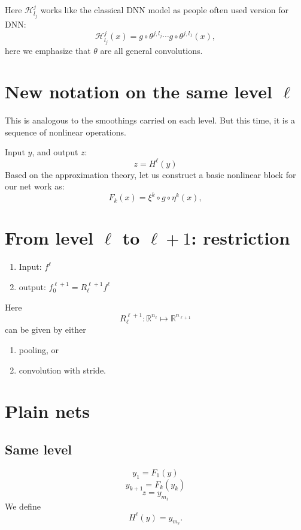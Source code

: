 Here $\mathcal{H}^j_{l_j}$ works like the classical DNN model as people often used version for DNN:
\begin{equation}
	\mathcal{H}_{l_j}^j (x) = g \circ \theta^{j,{l_j}}  \cdots g \circ \theta^{j,{l_1}} (x),
\end{equation}
here we emphasize that $\theta$ are all general convolutions.



\section{New notation on the same level $\ell$}
This is analogous to the smoothings carried on each level.  But this
time, it is a sequence of nonlinear operations. 

Input $y$, and output $z$:
$$
z=H^\ell(y)
$$
Based on the approximation theory, let us construct a basic nonlinear block for our net work as:
\begin{equation}\label{eq1-basic}
F_k(x) = \xi^k \circ g \circ \eta^k(x),
\end{equation}
\section{From level $\ell$ to $\ell+1$: restriction}

\begin{enumerate}
\item Input:  $f^\ell$
\item output:  $f^{\ell+1}_0 = R_{\ell}^{\ell+1}f^{\ell}$
\end{enumerate}

Here 
$$
 R_{\ell}^{\ell+1}: \mathbb R^{n_\ell}\mapsto \mathbb R^{n_{\ell+1}}
$$
can be given by either
\begin{enumerate}
\item pooling, or
\item convolution with stride.
\end{enumerate}

\section{Plain nets}

\subsection{Same level}
$$
y_1=F_1(y)
$$
$$
y_{k+1}=F_k(y_{k})
$$
$$
z=y_{m_\ell}
$$
We define
$$
H^\ell(y)=y_{m_\ell}.
$$

